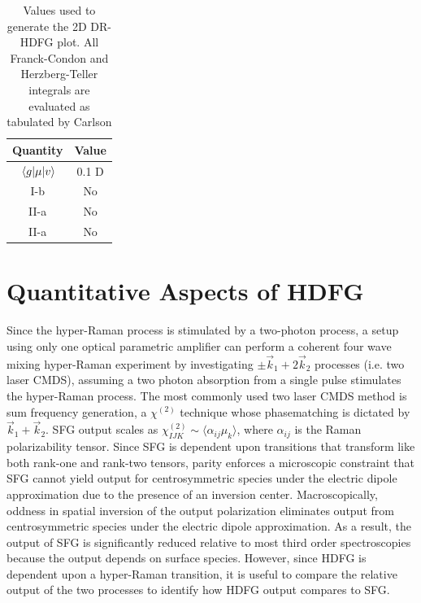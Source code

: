 \documentclass[aip, jcp, reprint, onecolumn]{revtex4-2}
\begin{document}
\begin{table}[!htbp]
	\caption{\label{T:hdfgvalues} Values used to generate the 2D DR-HDFG plot. 
	All Franck-Condon and Herzberg-Teller integrals are evaluated as tabulated by Carlson \cite{Carlson1988thesis}}
	\begin{ruledtabular}
		\begin{tabular}{cc}
			Quantity & Value\\
			\hline  
			$\mel{g}{\mu}{v}$ & 0.1 D\\
			I-b & No\\
			II-a & No\\
			II-a & No\\
		\end{tabular}
	\end{ruledtabular}
\end{table}

\section{Quantitative Aspects of HDFG}\label{quant}

Since the hyper-Raman process is stimulated by a two-photon process, a setup using only one optical parametric amplifier can perform a coherent four wave mixing hyper-Raman experiment by investigating $\pm \vec{k}_1 + 2\vec{k}_2$ processes (i.e. two laser CMDS), assuming a two photon absorption from a single pulse stimulates the hyper-Raman process.
The most commonly used two laser CMDS method is sum frequency generation, a $\chi^{(2)}$ technique whose phasematching is dictated by $\vec{k}_1 + \vec{k}_2$.
SFG output scales as $\chi^{(2)}_{IJK} \sim \langle \alpha_{ij} \mu_k \rangle$, where $\alpha_{ij}$ is the Raman polarizability tensor.
Since SFG is dependent upon transitions that transform like both rank-one and rank-two tensors, parity enforces a microscopic constraint that SFG cannot yield output for centrosymmetric species under the electric dipole approximation due to the presence of an inversion center. \cite{RN230}
Macroscopically, oddness in spatial inversion of the output polarization eliminates output from centrosymmetric species under the electric dipole approximation.\cite{RN133, RN132}
As a result, the output of SFG is significantly reduced relative to most third order spectroscopies because the output depends on surface species.
However, since HDFG is dependent upon a hyper-Raman transition, it is useful to compare the relative output of the two processes to identify how HDFG output compares to SFG.
\end{document}
